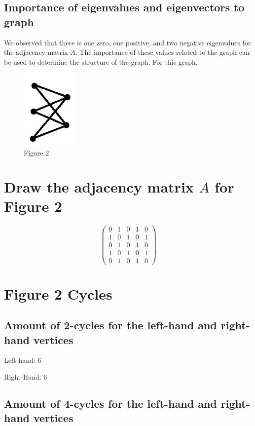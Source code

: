\documentclass[12pt]{scrreprt}
\begin{document}
\subsection{Importance of eigenvalues and eigenvectors to graph}

We observed that there is one zero, one positive, and two negative eigenvalues for the adjacency matrix $A$.
The importance of these values related to the graph can be used to determine the structure of the graph.
For this graph, 

\pagebreak

\begin{figure}[h]
	\centering
		\includegraphics[width=0.25\textwidth]{figure2}
	\caption{Figure 2}
\end{figure}

\section{Draw the adjacency matrix $A$ for Figure 2}

\[ \left( \begin{array}{ccccc}
0 & 1 & 0 & 1 & 0 \\
1 & 0 & 1 & 0 & 1 \\
0 & 1 & 0 & 1 & 0 \\
1 & 0 & 1 & 0 & 1 \\
0 & 1 & 0 & 1 & 0 \end{array} \right)\] 

\section{Figure 2 Cycles} 
\subsection{Amount of 2-cycles for the left-hand and right-hand vertices}

\centerline{Left-hand: 6}
\centerline{Right-Hand: 6}

\subsection{Amount of 4-cycles for the left-hand and right-hand vertices} 
\end{document}

